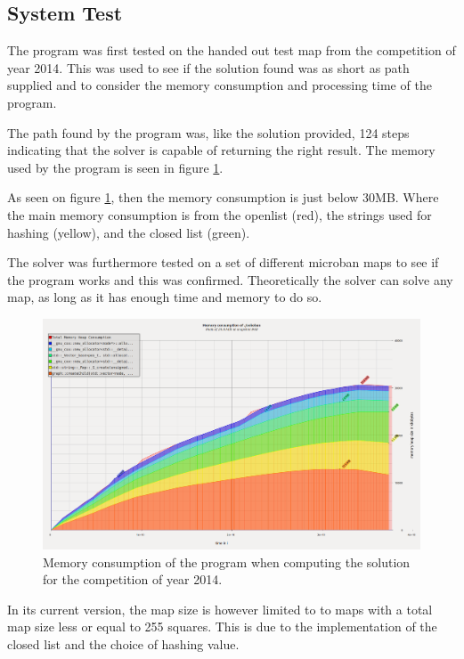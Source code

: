 \subsection{System Test}


The program was first tested on the handed out test map from the competition of year 2014.
This was used to see if the solution found was as short as path supplied and to consider the memory consumption and processing time of the program.

The path found by the program was, like the solution provided, 124 steps indicating that the solver is capable of returning the right result.
The memory used by the program is seen in figure \ref{fig:memoryconsumption2014}.


As seen on figure \ref{fig:memoryconsumption2014}, then the memory consumption is just below 30MB.
Where the main memory consumption is from the openlist (red), the strings used for hashing (yellow), and the closed list (green).

The solver was furthermore tested on a set of different microban maps to see if the program works and this was confirmed.
Theoretically the solver can solve any map, as long as it has enough time and memory to do so.


\begin{figure}[H]
\centering
\includegraphics[width = 0.8 \linewidth]{graphics/memoryconsumption.png}
\caption{Memory consumption of the program when computing the solution for the competition of year 2014.}
\label{fig:memoryconsumption2014}
\end{figure}

In its current version, the map size is however limited to to maps with a total map size less or equal to 255 squares.
This is due to the implementation of the closed list and the choice of hashing value.




